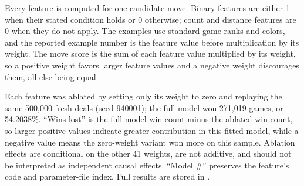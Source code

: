 \documentclass[11pt]{article}
\renewcommand{\arraystretch}{1.15}
\begin{document}
Every feature is computed for one candidate move. Binary features are either 1 when their stated condition holds or 0 otherwise; count and distance features are 0 when they do not apply. The examples use standard-game ranks and colors, and the reported example number is the feature value before multiplication by its weight. The move score is the sum of each feature value multiplied by its weight, so a positive weight favors larger feature values and a negative weight discourages them, all else being equal.

Each feature was ablated by setting only its weight to zero and replaying the same 500,000 fresh deals (seed 940001); the full model won 271,019 games, or 54.2038\%. ``Wins lost'' is the full-model win count minus the ablated win count, so larger positive values indicate greater contribution in this fitted model, while a negative value means the zero-weight variant won more on this sample. Ablation effects are conditional on the other 41 weights, are not additive, and should not be interpreted as independent causal effects. ``Model \#'' preserves the feature's code and parameter-file index. Full results are stored in .

\begingroup

\footnotesize

\setlength{\tabcolsep}{3pt}

\renewcommand{\arraystretch}{1.12}
\end{document}
